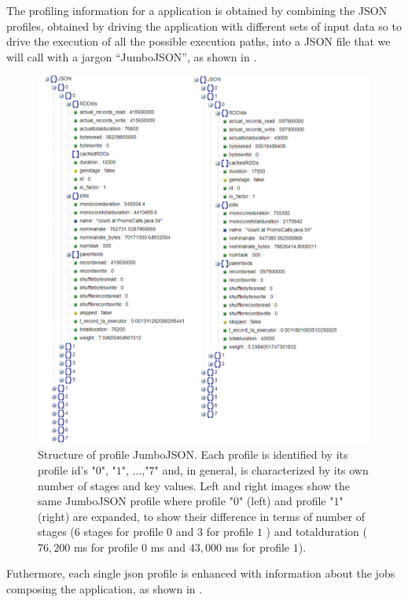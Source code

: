 The profiling information for a \tool application is obtained by combining the JSON profiles, obtained by driving the application with different sets of input data so to drive the execution of all the possible execution paths, into a JSON file that we will call with a jargon “JumboJSON”, as shown in .
\begin{figure}[tbhp]
	\hspace*{-2cm}
	\centering
	\includegraphics[width=18cm]{images/xsparksymb_profile_structure}
	\caption{Structure of profile JumboJSON. Each profile is identified by its profile id's {"$0$", "$1$", ...,"$7$"} and, in general, is characterized by its own number of stages and key values. Left and right images show the same JumboJSON profile where profile "$0$" (left) and profile "$1$" (right) are expanded, to show their difference in terms of number of stages ($6$ stages for profile $0$ and $3$ for profile $1$ ) and totalduration ($76,200$ ms for profile $0$ ms and  $43,000$ ms for profile $1$).}
	\label{fig:jumboJSON_structure}
\end{figure}
Futhermore, each single json profile is enhanced with information about the jobs composing the application, as shown in . 
